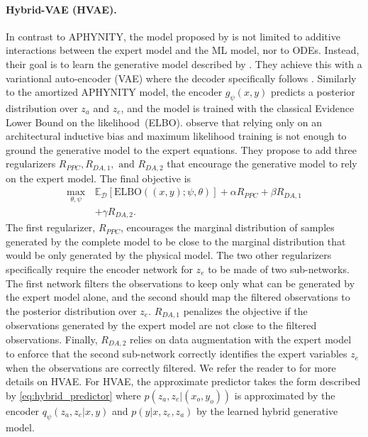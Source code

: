 \paragraph{Hybrid-VAE (HVAE).}
In contrast to APHYNITY, the model proposed by \citet{HVAE} is not limited to additive interactions between the expert model and the ML model, nor to ODEs. Instead, their goal is to learn the generative model described by . They achieve this with a variational auto-encoder (VAE) where the decoder specifically follows . Similarly to the amortized APHYNITY model, the encoder $g_\psi(x, y)$ predicts a posterior distribution over $z_a$ and $z_e$, and the model is trained with the classical Evidence Lower Bound on the likelihood~(ELBO). \citet{HVAE} observe that relying only on an architectural inductive bias and maximum likelihood training is not enough to ground the generative model to the expert equations. They propose to add three regularizers $R_{PPC}, R_{DA, 1},\text{ and } R_{DA, 2}$ that encourage the generative model to rely on the expert model. The final objective is
\begin{align}
    \max_{\theta, \psi}\, &\mathbb{E}_{\mathcal{D}}\left[ \text{ELBO} ((x, y); \psi, \theta)\right] + \alpha R_{PPC} + \beta R_{DA, 1} \nonumber \\&+ \gamma R_{DA, 2}. \label{eq:hvae_loss}
\end{align}
The first regularizer, $R_{PPC}$, encourages the marginal distribution of samples generated by the complete model to be close to the marginal distribution that would be only generated by the physical model. The two other regularizers specifically require the encoder network for $z_e$ to be made of two sub-networks. The first network filters the observations to keep only what can be generated by the expert model alone, and the second should map the filtered observations to the posterior distribution over $z_e$. $R_{DA, 1}$ penalizes the objective if the observations generated by the expert model are not close to the filtered observations. Finally, $R_{DA, 2}$ relies on data augmentation with the expert model to enforce that the second sub-network correctly identifies the expert variables $z_e$ when the observations are correctly filtered. We refer the reader to \citet{HVAE} for more details on HVAE. For HVAE, the approximate predictor takes the form described by \eqref{eq:hybrid_predictor} where $p(z_a, z_e|(x_o, y_o))$ is approximated by the encoder $q_\psi(z_a, z_e|x, y)$ and $p(y|x, z_e, z_a)$ by the learned hybrid generative model.

